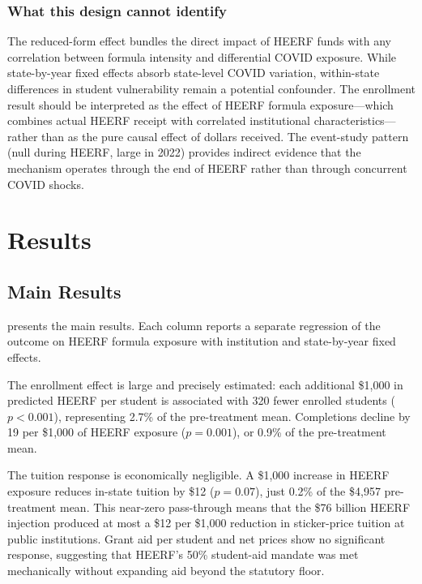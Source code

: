 \documentclass[12pt]{article}
\begin{document}
\subsubsection*{What this design cannot identify} The reduced-form effect bundles the direct impact of HEERF funds with any correlation between formula intensity and differential COVID exposure. While state-by-year fixed effects absorb state-level COVID variation, within-state differences in student vulnerability remain a potential confounder. The enrollment result should be interpreted as the effect of HEERF formula exposure---which combines actual HEERF receipt with correlated institutional characteristics---rather than as the pure causal effect of dollars received. The event-study pattern (null during HEERF, large in 2022) provides indirect evidence that the mechanism operates through the end of HEERF rather than through concurrent COVID shocks.

\section{Results}

\subsection{Main Results}



 presents the main results. Each column reports a separate regression of the outcome on HEERF formula exposure with institution and state-by-year fixed effects.

The enrollment effect is large and precisely estimated: each additional \$1,000 in predicted HEERF per student is associated with 320 fewer enrolled students ($p < 0.001$), representing 2.7\% of the pre-treatment mean. Completions decline by 19 per \$1,000 of HEERF exposure ($p = 0.001$), or 0.9\% of the pre-treatment mean.

The tuition response is economically negligible. A \$1,000 increase in HEERF exposure reduces in-state tuition by \$12 ($p = 0.07$), just 0.2\% of the \$4,957 pre-treatment mean. This near-zero pass-through means that the \$76 billion HEERF injection produced at most a \$12 per \$1,000 reduction in sticker-price tuition at public institutions. Grant aid per student and net prices show no significant response, suggesting that HEERF's 50\% student-aid mandate was met mechanically without expanding aid beyond the statutory floor.
\end{document}
